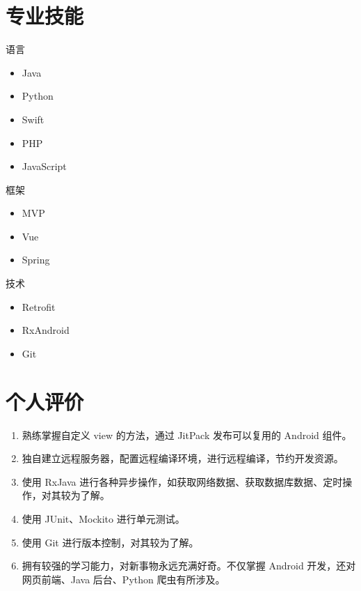 \documentclass[11pt]{res}
\begin{document}
\begin{resume}
\section{专业技能}
  \begin{multicols}{3}
    语言
    \begin{itemize}
      \item Java
      \item Python
      \item Swift
      \item PHP
      \item JavaScript
    \end{itemize}
    框架
    \begin{itemize}
      \item MVP
      \item Vue
      \item Spring
    \end{itemize}
    技术
    \begin{itemize}
      \item Retrofit
      \item RxAndroid
      \item Git
    \end{itemize}
  \end{multicols}

\section{个人评价}
  \begin{enumerate}
      \item 熟练掌握自定义 view 的方法，通过 JitPack 发布可以复用的 Android 组件。
      \item 独自建立远程服务器，配置远程编译环境，进行远程编译，节约开发资源。
      \item 使用 RxJava 进行各种异步操作，如获取网络数据、获取数据库数据、定时操作，对其较为了解。
      \item 使用 JUnit、Mockito 进行单元测试。
      \item 使用 Git 进行版本控制，对其较为了解。
      \item 拥有较强的学习能力，对新事物永远充满好奇。不仅掌握 Android 开发，还对网页前端、Java 后台、Python 爬虫有所涉及。
  \end{enumerate}

\end{resume}
\end{document}
